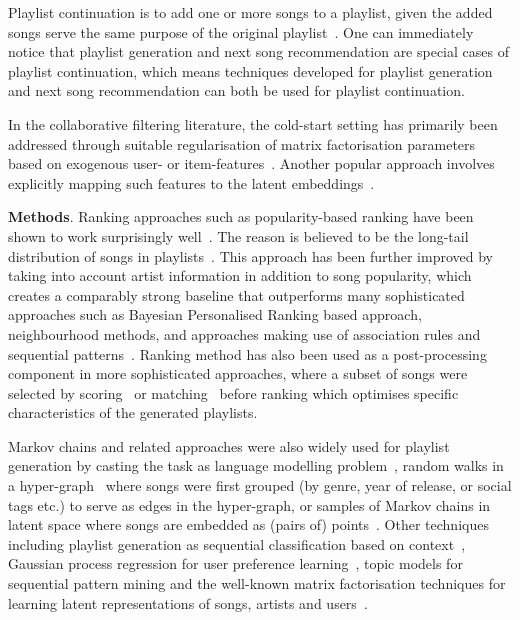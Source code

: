 Playlist continuation is to add one or more songs to a playlist,
given the added songs serve the same purpose of the original playlist~\cite{schedl2017,recsysch2018}.
One can immediately notice that playlist generation and next song recommendation are special cases
of playlist continuation, which means techniques developed for playlist generation and
next song recommendation can both be used for playlist continuation.

In the collaborative filtering literature,
the cold-start setting has primarily been addressed through
suitable regularisation of matrix factorisation parameters
based on exogenous user- or item-features~\cite{Ma:2008,Agarwal:2009,Cao:2010}.
Another popular approach involves explicitly mapping such features to the latent embeddings~\cite{Gantner:2010}.

{\bf Methods}.
Ranking approaches such as popularity-based ranking have been shown to
work surprisingly well~\cite{mcfee2012million,bonnin2013evaluating,bonnin2015automated}.
The reason is believed to be the long-tail distribution of songs in
playlists~\cite{cremonesi2010performance,bonnin2013evaluating}.
%
This approach has been further improved by taking into account artist information in addition to
song popularity, which creates a comparably strong baseline that outperforms many sophisticated
approaches such as Bayesian Personalised Ranking based approach, neighbourhood methods, and approaches
making use of association rules and sequential patterns~\cite{mcfee2012million,bonnin2013evaluating}.
%
Ranking method has also been used as a post-processing component in more sophisticated approaches,
where a subset of songs were selected by scoring~\cite{jannach2015beyond} or matching~\cite{hariri2012context}
before ranking which optimises specific characteristics of the generated playlists.


Markov chains and related approaches were also widely used for playlist generation by casting the task
as language modelling problem~\cite{mcfee2011natural},
random walks in a hyper-graph~\cite{mcfee2012hypergraph} where songs were first grouped (by genre,
year of release, or social tags etc.) to serve as edges in the hyper-graph, or samples of Markov chains
in latent space where songs are embedded as (pairs of) points~\cite{chen2012playlist}.
%
Other techniques including playlist generation as sequential classification based on context~\cite{ben2017groove},
Gaussian process regression for user preference learning~\cite{platt2002learning},
topic models for sequential pattern mining and the well-known matrix factorisation techniques for learning
latent representations of songs, artists and users~\cite{mcfee2012hypergraph,chen2012playlist,ben2017groove}.


